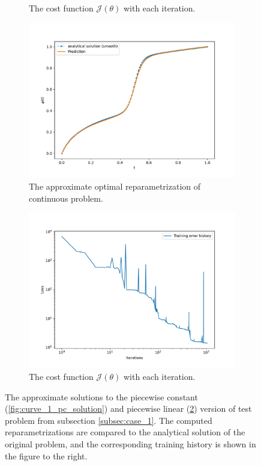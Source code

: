 \begin{figure}[t]
\begin{subfigure}[t]{0.5\textwidth}
        \caption{The cost function \(\mathcal{J}(\theta)\) with each iteration.}\label{fig:curve_1_pc_history}
    \end{subfigure}
    \begin{subfigure}[t]{0.5\textwidth}
        \centering
        \includegraphics[width=\linewidth]{figures/curve_1_pl/exp_2/plot_0_0.pdf}
        \caption{The approximate optimal reparametrization of continuous problem.}\label{fig:curve_1_pl_solution}\end{subfigure}
    \begin{subfigure}[t]{0.5\textwidth}
        \centering
        \includegraphics[width=\linewidth]{figures/curve_1_pl/exp_2/history_plot_0.pdf}
        \caption{The cost function \(\mathcal{J}(\theta)\) with each iteration.}\label{fig:curve_1_pl_history}
    \end{subfigure}
    \caption{The approximate solutions to the piecewise constant (\ref{fig:curve_1_pc_solution}) and piecewise linear (\ref{fig:curve_1_pl_solution}) version of test problem from subsection \ref*{subsec:case_1}. The computed reparametrizations are compared to the analytical solution of the original problem, and the corresponding training history is shown in the figure to the right.}\label{fig:curve_1_pc_pl_example}
\end{figure}

